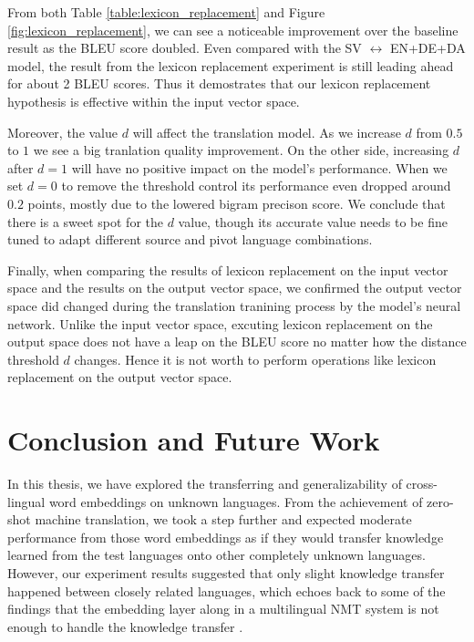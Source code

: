 \documentclass[thesis,fonts=libertine]{cluu}
\begin{document}
From both Table \ref{table:lexicon_replacement} and Figure \ref{fig:lexicon_replacement}, we can see a noticeable improvement over the baseline result as the BLEU score doubled. Even compared with the SV $\leftrightarrow$ EN+DE+DA model, the result from the lexicon replacement experiment is still leading ahead for about 2 BLEU scores. Thus it demostrates that our lexicon replacement hypothesis is effective within the input vector space.

Moreover, the value $d$ will affect the translation model. As we increase $d$ from $0.5$ to $1$ we see a big tranlation quality improvement. On the other side, increasing $d$ after $d=1$ will have no positive impact on the model's performance. When we set $d=0$ to remove the threshold control its performance even dropped around $0.2$ points, mostly due to the lowered bigram precison score. We conclude that there is a sweet spot for the $d$ value, though its accurate value needs to be fine tuned to adapt different source and pivot language combinations.

Finally, when comparing the results of lexicon replacement on the input vector space and the results on the output vector space, we confirmed the output vector space did changed during the translation tranining process by the model's neural network. Unlike the input vector space, excuting lexicon replacement on the output space does not have a leap on the BLEU score no matter how the distance threshold $d$ changes. Hence it is not worth to perform operations like lexicon replacement on the output vector space.

\chapter{Conclusion and Future Work}
\label{chap:conclusion}

In this thesis, we have explored the transferring and generalizability of cross-lingual word embeddings on unknown languages. From the achievement of zero-shot machine translation, we took a step further and expected moderate performance from those word embeddings as if they would transfer knowledge learned from the test languages onto other completely unknown languages. However, our experiment results suggested that only slight knowledge transfer happened between closely related languages, which echoes back to some of the findings that the embedding layer along in a multilingual NMT system is not enough to handle the knowledge transfer \parencite{aji-etal-2020-neural}.
\end{document}
